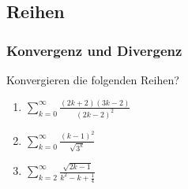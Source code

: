\documentclass[11pt, a4paper]{article}
\newcommand{\abs}[1]{\left\lvert#1\right\rvert}
\newif\ifshowsolution
\begin{document}
\subsection{Reihen}
\subsubsection{Konvergenz und Divergenz}
Konvergieren die folgenden Reihen?
\begin{enumerate}
	\item $\sum_{k=0}^\infty \frac{(2k+2)(3k-2)}{(2k-2)^2}$
	
	\ifshowsolution
		\begin{align*}
			a_k &= \frac{(2k+2)(3k-2)}{(2k-2)^2} \\
			&= \frac{6k^2+2k-4}{4k^4-8k+4}
		\end{align*}
		$\lim_{k->\infty} a_k = \frac{3}{2} \neq 0$, die Reihe divergiert.
	\fi
		
	\item $\sum_{k=0}^\infty \frac{(k-1)^2}{\sqrt{3^k}}$
	
	\ifshowsolution
		\begin{align*}
			\lambda &= \lim_{k->\infty} \abs{ \frac{\frac{k^2}{\sqrt{3^{k+1}}}}{\frac{(k-1)^2}{\sqrt{3^k}}} } \tag{Quotientenkriterium} \\
			&= \lim_{k->\infty} \abs{ \frac{\frac{\sqrt{3^k} k^2}{\sqrt{3^{k+1}}}}{(k-1)^2} } \\
			&= \lim_{k->\infty} \abs{ \frac{k^2 \frac{\sqrt{3^k}}{\sqrt{3^{k+1}}}}{(k-1)^2} } \\
			&= \lim_{k->\infty} \abs{ \frac{k^2 \sqrt{\frac{3^k}{3^{k+1}}}}{(k-1)^2} } \\
			&= \lim_{k->\infty} \abs{ \frac{k^2 \sqrt{\frac{1}{3}}}{k^2-2k+1} } \\
			\intertext{Der Grenzwert des Bruches ist der Quotient der Koeffizienten am größten Term, also}
			\lambda &= \sqrt{\frac{1}{3}}
		\end{align*}
		Lambda ist $<1$, laut Quotientenkriterium ist die Reihe damit (absolut) konvergent.
	\fi
		
	\item $\sum_{k=2}^\infty \frac{\sqrt{2k-1}}{k^2-k+\frac{1}{4}}$
	
	\ifshowsolution
		\begin{align*}
			\shortintertext{Die Konvergenz der Reihe $\sum_{k=1}^\infty \frac{1}{k^2}$ ist aus der Vorlesung bekannt}
			\frac{\sqrt{2k-1}}{k^2-k+\frac{1}{4}} &\leq \frac{1}{k^2} \\
			\frac{\sqrt{2} \cdot \sqrt{k+\frac{1}{2}}}{(k-\frac{1}{2})^2} &\leq \frac{1}{k^2} \\
			\frac{2 \cdot (k+\frac{1}{2})}{(k-\frac{1}{2})^4} &\leq \frac{1}{k^2} \\
			\frac{2}{(k-\frac{1}{2})^3} &\leq \frac{1}{k^2}
		\end{align*}
		Nach dem Majorantenkriterium ist diese Reihe also (absolut) konvergent.
	\fi
\end{enumerate}
\end{document}
